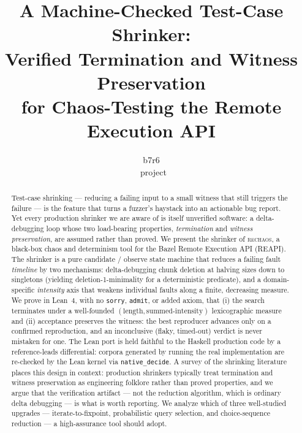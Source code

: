 \documentclass[10pt,twocolumn,letterpaper]{article}
\title{\bf A Machine-Checked Test-Case Shrinker:\\
Verified Termination and Witness Preservation\\
for Chaos-Testing the Remote Execution API}
\author{
{\rm b7r6} \qquad {\rm Claude Fable 5 (Anthropic)}\\
\rc\ project
}
\date{}
\newcommand{\rc}{\textsc{rechaos}}
\begin{document}
\maketitle
\thispagestyle{empty}

\begin{abstract}
Test-case shrinking --- reducing a failing input to a small witness that still
triggers the failure --- is the feature that turns a fuzzer's haystack into an
actionable bug report. Yet every production shrinker we are aware of is itself
unverified software: a delta-debugging loop whose two load-bearing properties,
\emph{termination} and \emph{witness preservation}, are assumed rather than
proved. We present the shrinker of \rc, a black-box chaos and determinism tool
for the Bazel Remote Execution API (REAPI). The shrinker is a pure candidate /
observe state machine that reduces a failing fault \emph{timeline} by two
mechanisms: delta-debugging chunk deletion at halving sizes down to singletons
(yielding deletion-1-minimality for a deterministic predicate), and a
domain-specific \emph{intensity} axis that weakens individual faults along a
finite, decreasing measure. We prove in Lean~4, with no \texttt{sorry},
\texttt{admit}, or added axiom, that (i) the search terminates under a
well-founded $(\mathrm{length}, \mathrm{summed\text{-}intensity})$ lexicographic
measure and (ii) acceptance preserves the witness: the best reproducer advances
only on a confirmed reproduction, and an inconclusive (flaky, timed-out) verdict
is never mistaken for one. The Lean port is held faithful to the Haskell
production code by a reference-leads differential: corpora generated by running
the real implementation are re-checked by the Lean kernel via
\texttt{native\_decide}. A survey of the shrinking literature places this design
in context: production shrinkers typically treat termination and witness
preservation as engineering folklore rather than proved properties, and we argue
that the verification artifact --- not the reduction algorithm, which is ordinary
delta debugging --- is what is worth reporting. We analyze which of three
well-studied upgrades --- iterate-to-fixpoint, probabilistic query selection, and
choice-sequence reduction --- a high-assurance tool should adopt.
\end{abstract}

\end{document}
